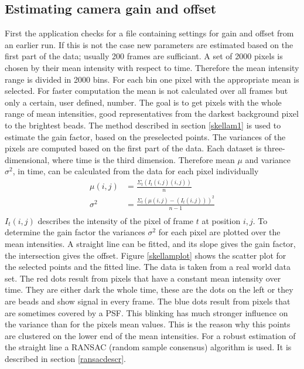 \subsection{Estimating camera gain and offset}
First the application checks for a file containing settings for gain and offset from an earlier run. If this is not the case new parameters are estimated based on the first part of the data; usually 200 frames are sufficiant.\newline
A set of 2000 pixels is chosen by their mean intensity with respect to time. Therefore the mean intensity range is divided in 2000 bins. For each bin one pixel with the appropriate mean is selected. For faster computation the mean is not calculated over all frames but only a certain, user defined, number. The goal is to get pixels with the whole range of mean intensities, good representatives from the darkest background pixel to the brightest beads.\newline 
The method described in section \ref{skellam1} is used to estimate the gain factor, based on the preselected points. The variances of the pixels are computed based on the first part of the data.
Each dataset is three-dimensional, where time is the third
dimension. Therefore mean $\mu$ and variance $\sigma^2$, in time, can be calculated from
the data for each pixel individually
\begin{align}
	\mu(i,j) & = \frac{\Sigma_t(I_t(i,j)(i,j))}{n}\\
	\sigma^2 & = \frac{\Sigma_t(\mu(i,j)-(I_t(i,j)))^2}{n-1}\\
\end{align} 
$I_t(i,j)$ describes the intensity of the pixel of frame $t$ at position $i,j$.
To determine the gain factor the variances $\sigma^2$ for each pixel are plotted over the mean
intensities. A straight line can be fitted, and its slope gives the gain
factor, the intersection gives the offset.\newline 
Figure \ref{skellamplot} shows the scatter plot for the selected points and the fitted line. The data is taken from a real world data set. The red dots result from pixels that have a constant mean intensity over time. They are either dark the whole time, these are the dots on the left or they are beads and show signal in every frame. The blue dots result from pixels that are sometimes covered by a PSF. This blinking has much stronger influence on the variance than for the pixels mean values. This is the reason why this points are clustered on the lower end of the mean intensities. \newline
For a robust estimation of the straight line a RANSAC (random sample consensus) algorithm is used. It is described in section \ref{ransacdescr}. 

